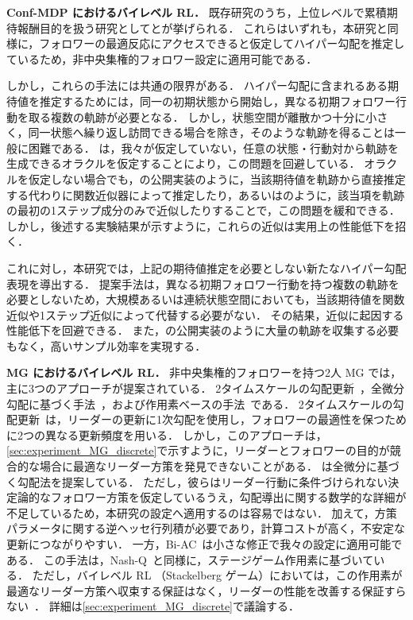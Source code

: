 \documentclass[originalpaper,fleqn]{jsaiart}     %
\begin{document}
\textbf{Conf-MDP におけるバイレベル RL．}
既存研究のうち，上位レベルで累積期待報酬目的を扱う研究として\cite{Thoma2024-em}と\cite{Yang2025-lr}が挙げられる．
これらはいずれも，本研究と同様に，フォロワーの最適反応にアクセスできると仮定してハイパー勾配を推定しているため，非中央集権的フォロワー設定に適用可能である．

しかし，これらの手法には共通の限界がある．
ハイパー勾配に含まれるある期待値を推定するためには，同一の初期状態から開始し，異なる初期フォロワー行動を取る複数の軌跡が必要となる．
しかし，状態空間が離散かつ十分に小さく，同一状態へ繰り返し訪問できる場合を除き，そのような軌跡を得ることは一般に困難である．
\cite{Thoma2024-em}は，我々が仮定していない，任意の状態・行動対から軌跡を生成できるオラクルを仮定することにより，この問題を回避している．
オラクルを仮定しない場合でも，\cite{Thoma2024-em}の公開実装のように，当該期待値を軌跡から直接推定する代わりに関数近似器によって推定したり，あるいは\cite{Yang2025-lr}のように，該当項を軌跡の最初の1ステップ成分のみで近似したりすることで，この問題を緩和できる．
しかし，後述する実験結果が示すように，これらの近似は実用上の性能低下を招く．

これに対し，本研究では，上記の期待値推定を必要としない新たなハイパー勾配表現を導出する．
提案手法は，異なる初期フォロワー行動を持つ複数の軌跡を必要としないため，大規模あるいは連続状態空間においても，当該期待値を関数近似や1ステップ近似によって代替する必要がない．
その結果，近似に起因する性能低下を回避できる．
また，\cite{Thoma2024-em}の公開実装のように大量の軌跡を収集する必要もなく，高いサンプル効率を実現する．

\textbf{MG におけるバイレベル RL．}
非中央集権的フォロワーを持つ2人 MG では，主に3つのアプローチが提案されている．
2タイムスケールの勾配更新~\cite{Rajeswaran2020-gv,Vu2022-jq}，全微分勾配に基づく手法~\cite{Yang2023-tf}，および作用素ベースの手法~\cite{Zhang2020-hw}である．
2タイムスケールの勾配更新~\cite{Rajeswaran2020-gv,Vu2022-jq}は，リーダーの更新に1次勾配を使用し，フォロワーの最適性を保つために2つの異なる更新頻度を用いる．
しかし，このアプローチは，\ref{sec:experiment_MG_discrete}で示すように，リーダーとフォロワーの目的が競合的な場合に最適なリーダー方策を発見できないことがある．
\cite{Yang2023-tf}は全微分に基づく勾配法を提案している．
ただし，彼らはリーダー行動に条件づけられない決定論的なフォロワー方策を仮定しているうえ，勾配導出に関する数学的な詳細が不足しているため，本研究の設定へ適用するのは容易ではない．
加えて，方策パラメータに関する逆ヘッセ行列積が必要であり，計算コストが高く，不安定な更新につながりやすい．
一方，Bi-AC~\cite{Zhang2020-hw}は小さな修正で我々の設定に適用可能である．
この手法は，Nash-Q~\cite{Hu2003-vz}と同様に，ステージゲーム作用素に基づいている．
ただし，バイレベル RL （Stackelberg ゲーム）においては，この作用素が最適なリーダー方策へ収束する保証はなく，リーダーの性能を改善する保証すらない~\cite{Kudo2026-ty}．
詳細は\ref{sec:experiment_MG_discrete}で議論する．
\end{document}
